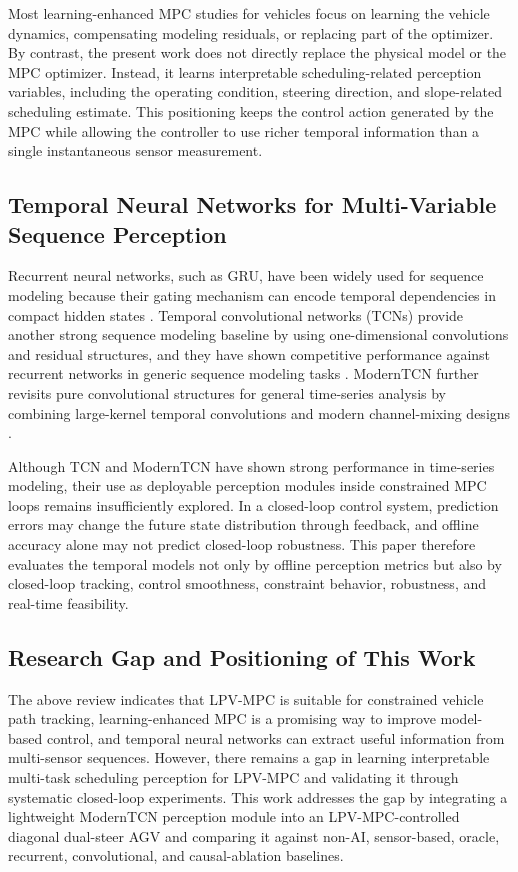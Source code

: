 \documentclass{ieeeaccess}
\begin{document}
Most learning-enhanced MPC studies for vehicles focus on learning the vehicle dynamics, compensating modeling residuals, or replacing part of the optimizer. By contrast, the present work does not directly replace the physical model or the MPC optimizer. Instead, it learns interpretable scheduling-related perception variables, including the operating condition, steering direction, and slope-related scheduling estimate. This positioning keeps the control action generated by the MPC while allowing the controller to use richer temporal information than a single instantaneous sensor measurement.

\subsection{Temporal Neural Networks for Multi-Variable Sequence Perception}

Recurrent neural networks, such as GRU, have been widely used for sequence modeling because their gating mechanism can encode temporal dependencies in compact hidden states \cite{Cho2014GRU}. Temporal convolutional networks (TCNs) provide another strong sequence modeling baseline by using one-dimensional convolutions and residual structures, and they have shown competitive performance against recurrent networks in generic sequence modeling tasks \cite{Bai2018TCN}. ModernTCN further revisits pure convolutional structures for general time-series analysis by combining large-kernel temporal convolutions and modern channel-mixing designs \cite{Luo2024ModernTCN}.

Although TCN and ModernTCN have shown strong performance in time-series modeling, their use as deployable perception modules inside constrained MPC loops remains insufficiently explored. In a closed-loop control system, prediction errors may change the future state distribution through feedback, and offline accuracy alone may not predict closed-loop robustness. This paper therefore evaluates the temporal models not only by offline perception metrics but also by closed-loop tracking, control smoothness, constraint behavior, robustness, and real-time feasibility.

\subsection{Research Gap and Positioning of This Work}

The above review indicates that LPV-MPC is suitable for constrained vehicle path tracking, learning-enhanced MPC is a promising way to improve model-based control, and temporal neural networks can extract useful information from multi-sensor sequences. However, there remains a gap in learning interpretable multi-task scheduling perception for LPV-MPC and validating it through systematic closed-loop experiments. This work addresses the gap by integrating a lightweight ModernTCN perception module into an LPV-MPC-controlled diagonal dual-steer AGV and comparing it against non-AI, sensor-based, oracle, recurrent, convolutional, and causal-ablation baselines.
\end{document}
